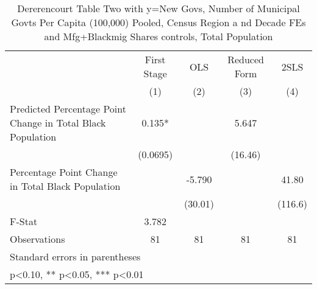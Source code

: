 \begin{table}[htbp]\centering
\def\sym#1{\ifmmode^{#1}\else\(^{#1}\)\fi}
\caption{Dererencourt Table Two with y=New Govs, Number of Municipal Govts Per Capita (100,000) Pooled, Census Region a nd Decade FEs and Mfg+Blackmig Shares controls, Total Population}
\begin{tabular}{l*{4}{c}}
\toprule
                    & First Stage   &         OLS   &Reduced Form   &        2SLS   \\
                    &\multicolumn{1}{c}{(1)}   &\multicolumn{1}{c}{(2)}   &\multicolumn{1}{c}{(3)}   &\multicolumn{1}{c}{(4)}   \\
\midrule
Predicted Percentage Point Change in Total Black Population&       0.135*  &               &       5.647   &               \\
                    &    (0.0695)   &               &     (16.46)   &               \\
\addlinespace
Percentage Point Change in Total Black Population&               &      -5.790   &               &       41.80   \\
                    &               &     (30.01)   &               &     (116.6)   \\
\midrule
F-Stat              &       3.782   &               &               &               \\
Observations        &          81   &          81   &          81   &          81   \\
\bottomrule
\multicolumn{5}{l}{\footnotesize Standard errors in parentheses}\\
\multicolumn{5}{l}{\footnotesize * p<0.10, ** p<0.05, *** p<0.01}\\
\end{tabular}
\end{table}
